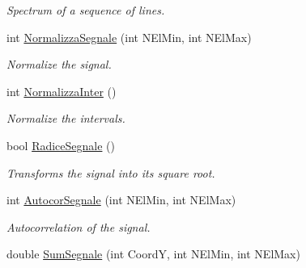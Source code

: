 \begin{DoxyCompactItemize}
\begin{DoxyCompactList}\small\item\em Spectrum of a sequence of lines. \end{DoxyCompactList}\item 
int \hyperlink{classVarDatFile_a0e495e387b74aaa6d55510a945236064}{Normalizza\+Segnale} (int N\+El\+Min, int N\+El\+Max)\hypertarget{classVarDatFile_a0e495e387b74aaa6d55510a945236064}{}\label{classVarDatFile_a0e495e387b74aaa6d55510a945236064}

\begin{DoxyCompactList}\small\item\em Normalize the signal. \end{DoxyCompactList}\item 
int \hyperlink{classVarDatFile_a2f01ea77260e98cb7edbb892988fd687}{Normalizza\+Inter} ()\hypertarget{classVarDatFile_a2f01ea77260e98cb7edbb892988fd687}{}\label{classVarDatFile_a2f01ea77260e98cb7edbb892988fd687}

\begin{DoxyCompactList}\small\item\em Normalize the intervals. \end{DoxyCompactList}\item 
bool \hyperlink{classVarDatFile_ab68c66ee2972197a35b5225793337637}{Radice\+Segnale} ()\hypertarget{classVarDatFile_ab68c66ee2972197a35b5225793337637}{}\label{classVarDatFile_ab68c66ee2972197a35b5225793337637}

\begin{DoxyCompactList}\small\item\em Transforms the signal into its square root. \end{DoxyCompactList}\item 
int \hyperlink{classVarDatFile_a9aaf71e7c7f27423252d8359f746e4ff}{Autocor\+Segnale} (int N\+El\+Min, int N\+El\+Max)\hypertarget{classVarDatFile_a9aaf71e7c7f27423252d8359f746e4ff}{}\label{classVarDatFile_a9aaf71e7c7f27423252d8359f746e4ff}

\begin{DoxyCompactList}\small\item\em Autocorrelation of the signal. \end{DoxyCompactList}\item 
double \hyperlink{classVarDatFile_a6489d2b859470a4e034bc4f795336ae8}{Sum\+Segnale} (int CoordY, int N\+El\+Min, int N\+El\+Max)\hypertarget{classVarDatFile_a6489d2b859470a4e034bc4f795336ae8}{}\label{classVarDatFile_a6489d2b859470a4e034bc4f795336ae8}


\end{DoxyCompactItemize}
